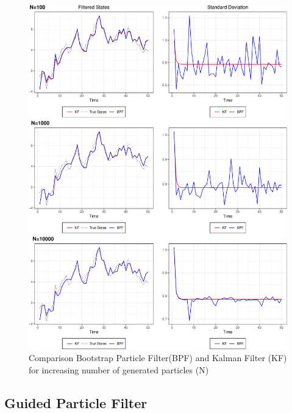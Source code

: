 \documentclass[
]{book}
\theoremstyle{break}
\theoremstyle{nonumberplain}
\begin{document}
\begin{figure}[H]

{\centering \includegraphics{prova_knit_finale_files/figure-latex/myfig4-1} 

}

\caption{Comparison Bootstrap Particle Filter(BPF) and Kalman Filter (KF) for increasing number of generated particles (N)}\label{fig:myfig4}
\end{figure}

\subsection{Guided Particle Filter}
\end{document}
